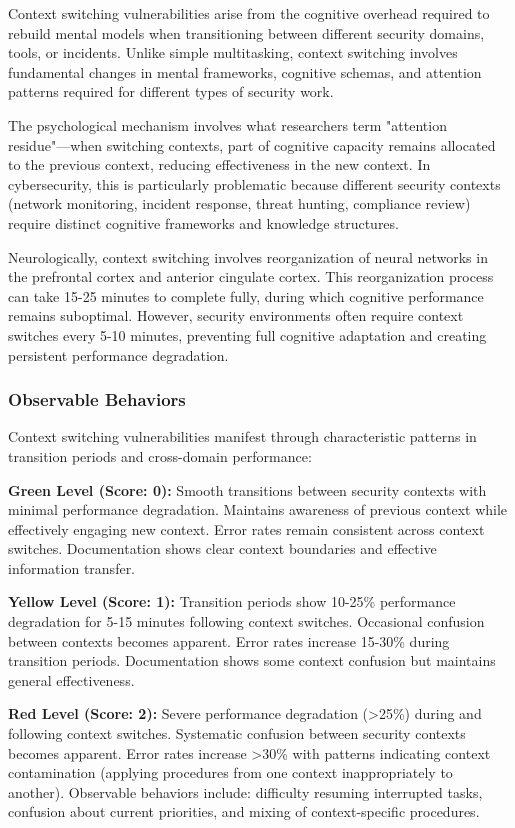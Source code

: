 \documentclass[11pt,a4paper]{article}
\begin{document}
Context switching vulnerabilities arise from the cognitive overhead required to rebuild mental models when transitioning between different security domains, tools, or incidents\cite{altmann2002}. Unlike simple multitasking, context switching involves fundamental changes in mental frameworks, cognitive schemas, and attention patterns required for different types of security work.

The psychological mechanism involves what researchers term "attention residue"---when switching contexts, part of cognitive capacity remains allocated to the previous context, reducing effectiveness in the new context\cite{leroy2009}. In cybersecurity, this is particularly problematic because different security contexts (network monitoring, incident response, threat hunting, compliance review) require distinct cognitive frameworks and knowledge structures.

Neurologically, context switching involves reorganization of neural networks in the prefrontal cortex and anterior cingulate cortex\cite{monsell2003}. This reorganization process can take 15-25 minutes to complete fully, during which cognitive performance remains suboptimal. However, security environments often require context switches every 5-10 minutes, preventing full cognitive adaptation and creating persistent performance degradation.

\subsubsection{Observable Behaviors}

Context switching vulnerabilities manifest through characteristic patterns in transition periods and cross-domain performance:

\textbf{Green Level (Score: 0):} Smooth transitions between security contexts with minimal performance degradation. Maintains awareness of previous context while effectively engaging new context. Error rates remain consistent across context switches. Documentation shows clear context boundaries and effective information transfer.

\textbf{Yellow Level (Score: 1):} Transition periods show 10-25\% performance degradation for 5-15 minutes following context switches. Occasional confusion between contexts becomes apparent. Error rates increase 15-30\% during transition periods. Documentation shows some context confusion but maintains general effectiveness.

\textbf{Red Level (Score: 2):} Severe performance degradation (>25\%) during and following context switches. Systematic confusion between security contexts becomes apparent. Error rates increase >30\% with patterns indicating context contamination (applying procedures from one context inappropriately to another). Observable behaviors include: difficulty resuming interrupted tasks, confusion about current priorities, and mixing of context-specific procedures.
\end{document}
